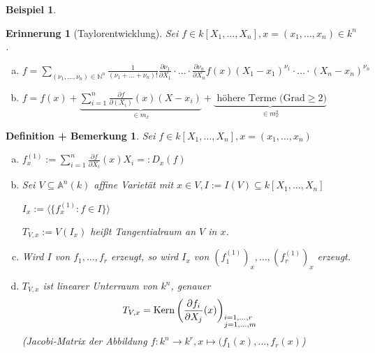 \documentclass[a4paper, 12pt, numbers=noendperiod, chapterprefix=true]{scrbook}
\theoremstyle{break}
\newtheorem{DefBem}[Def]{Definition + Bemerkung}
\newtheorem{Erinn}[Def]{Erinnerung}
\newtheorem{Bsp}[Def]{Beispiel}
\theoremstyle{nonumberbreak}
\theoremstyle{nonumberplain}
\newcommand{\Sum}{\sum\limits}
\DeclareMathOperator{\Kern}{Kern}
\newcommand{\N}{\mathbb{N}}
\newcommand{\A}{\mathbb{A}}
\begin{document}
\begin{Bsp}
\begin{enumerate}[a)]
\begin{minipage}{0.3\linewidth}
\begin{flushright}
\end{flushright}\end{minipage}
\end{enumerate}\end{Bsp}

\begin{Erinn}[Taylorentwicklung]
Sei $f\in k[X_1,\ldots ,X_n], x=(x_1,\ldots ,x_n)\in k^n$.\begin{enumerate}[a)]
\item
	$f=\Sum_{(\nu_1,\ldots ,\nu_n)\in \N^n} \frac{1}{(\nu_1+\ldots +\nu_n)!}\frac{\partial\nu_1}{\partial X_1}\cdot\ldots \cdot \frac{\partial\nu_n}{\partial X_n} f(x)(X_1-x_1)^{\nu_1}\cdot\ldots \cdot(X_n-x_n)^{\nu_n}$
\item
	$f=f(x)+ \underbrace{\Sum_{i=1}^n\frac{\partial f}{\partial(X_i)}(x)(X-x_i)}_{\in m_x} + \underbrace{\text{ h\"ohere Terme (Grad} \ge2)}_{\in m_x^2}$
\end{enumerate}\end{Erinn}

\begin{DefBem}\label{16.3}
Sei $f \in k[X_1,\ldots ,X_n], x=(x_1,\ldots ,x_n)$\begin{enumerate}[a)]
\item
	$f_x^{(1)}:=\Sum_{i=1}^n\frac{\partial f}{\partial X_i}(x)X_i =:D_x(f)$
\item
	Sei $V\subseteq \A^n(k)$ affine Variet\"at mit $x\in V, I:=I(V)\subseteq k[X_1,\ldots ,X_n]$
	
	$I_x:=\langle\{f_x^{(1)}:f\in I\}\rangle$
	
	$T_{V,x}:=V(I_x)$ hei\ss t Tangentialraum an $V$ in $x$.
\item
	Wird $I$ von $f_1,\ldots ,f_r$ erzeugt, so wird $I_x$ von $(f_1^{(1)})_x,\ldots ,(f_r^{(1)})_x$ erzeugt.
\item\label{16.3d}
	$T_{V,x}$ ist linearer Unterraum von $k^n$, genauer
		\[ T_{V,x}=\Kern\left( \frac{\partial f_i}{\partial X_j}(x) \right)_{\begin{subarray}{l}i=1,\ldots ,r\\j=1,\ldots ,m\end{subarray}}\]
	(Jacobi-Matrix der Abbildung $f:k^n\to k^r, x\mapsto(f_1(x),\ldots ,f_r(x)$)
\end{enumerate}\end{DefBem}
\end{document}
